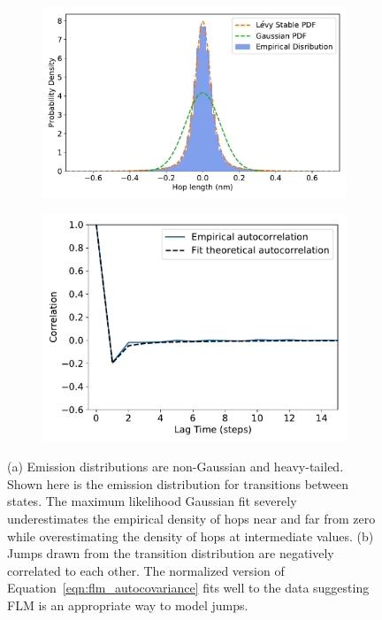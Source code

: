 \documentclass[12pt]{article}
\begin{document}
  \begin{figure}
  \centering
  \begin{subfigure}{0.49\textwidth}
  \includegraphics[width=\textwidth]{gaussian_levy_comparison.pdf}
  \caption{}\label{fig:gaussian_levy_comparison}
  \end{subfigure}
  \begin{subfigure}{0.42\textwidth}
  \includegraphics[width=\textwidth]{msddm_acf.pdf}
  \caption{}\label{fig:msddm_acf}
  \end{subfigure}
  \caption{(a) Emission distributions are non-Gaussian and heavy-tailed. Shown here is the
  emission distribution for transitions between states. The maximum likelihood
  Gaussian fit severely underestimates the empirical density of hops near and far from zero 
  while overestimating the density of hops at intermediate values. (b) Jumps drawn from
  the transition distribution are negatively correlated to each other. The normalized version 
  of Equation~\ref{eqn:flm_autocovariance} fits well to the data suggesting FLM is
  an appropriate way to model jumps.} \label{fig:msddm_emissions}
  \end{figure}
  
\end{document}
